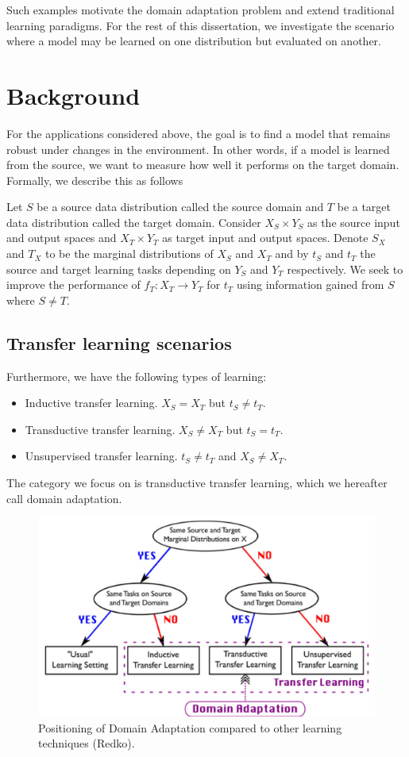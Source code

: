 Such examples motivate the domain adaptation problem and extend traditional learning paradigms. For the rest of this dissertation, we investigate the scenario where a model may be learned on one distribution but evaluated on another.

\section{Background}
For the applications considered above, the goal is to find a model that remains robust under changes in the environment. In other words, if a model is learned from the source, we want to measure how well it performs on the target domain. Formally, we describe this as follows

\begin{theorem}
	Let $S$ be a source data distribution called the source domain and $T$ be a target data distribution called the target domain. Consider $X_S\times Y_S$ as the source input and output spaces and $X_T\times Y_T$ as target input and output spaces. Denote $S_X$ and $T_X$ to be the marginal distributions of $X_S$ and $X_T$ and by $t_S$ and $t_T$ the source and target learning tasks depending on $Y_S$ and $Y_T$ respectively. We seek to improve the performance of $f_{T}:X_T\to Y_T$ for $t_T$ using information gained from $S$ where $S\neq T$.
\end{theorem}

\subsection{Transfer learning scenarios}
 
Furthermore, we have the following types of learning:
\begin{itemize}
	\item Inductive transfer learning. $X_S=X_T$ but $t_S\neq t_T$.
	\item Transductive transfer learning. $X_S\neq X_T$ but $t_S=t_T$.
	\item Unsupervised transfer learning. $t_S\neq t_T$ and $X_S\neq X_T$.
\end{itemize}

The category we focus on is transductive transfer learning, which we hereafter call domain adaptation.

\begin{figure}
	\centering
	\includegraphics[width=0.7\linewidth]{pictures/DA_tree}
	\caption{Positioning of Domain Adaptation compared to other learning techniques (Redko).}
	\label{fig:datree}
\end{figure}


